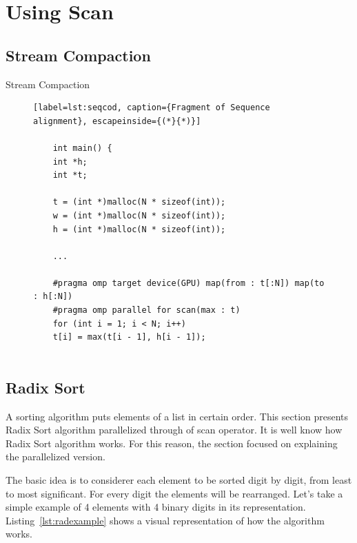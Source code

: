 \documentclass[Ingles]{ic-tese-v1}
\newcommand{\rlst}[1]{Listing~\ref{lst:#1}}
\begin{document}
\chapter{Using Scan}
\label{cap:ScanUse}

\section{Stream Compaction}

Stream Compaction

\begin{figure}[t]
	\lstset{basicstyle=\scriptsize}
	\begin{lstlisting}[label=lst:seqcod, caption={Fragment of Sequence alignment}, escapeinside={(*}{*)}]
	
	int main() {
	int *h;
	int *t;
	
	t = (int *)malloc(N * sizeof(int));
	w = (int *)malloc(N * sizeof(int));
	h = (int *)malloc(N * sizeof(int));
	
	...
	
	#pragma omp target device(GPU) map(from : t[:N]) map(to : h[:N])
	#pragma omp parallel for scan(max : t)
	for (int i = 1; i < N; i++)
	t[i] = max(t[i - 1], h[i - 1]);
	
	\end{lstlisting}
\end{figure}

\section{Radix Sort}
\label{sec:Quicksort}

A sorting algorithm puts elements of a list in certain order. This section
presents Radix Sort algorithm parallelized through of scan operator. It is
well know how Radix Sort algorithm works.  For this reason, the section
focused on explaining the parallelized version.

The basic idea is to considerer each element to be sorted digit by digit, from
least to most significant. For every digit the elements will be rearranged.
Let’s take a simple example of 4 elements with 4 binary digits in its
representation. \rlst{radexample} shows a visual representation of how the
algorithm works.
\end{document}
